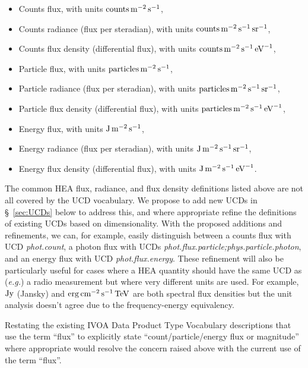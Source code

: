 \documentclass[11pt,a4paper]{ivoa}
\begin{document}
\begin{itemize}
\item Counts flux, with units $\rm\hbox{counts}\,m^{-2}\,s^{-1}$,
\item Counts radiance (flux per steradian), with units $\rm\hbox{counts}\,m^{-2}\,s^{-1}\,\hbox{sr}^{-1}$,
\item Counts flux density (differential flux), with units $\rm\hbox{counts}\,m^{-2}\,s^{-1}\,\hbox{eV}^{-1}$,
\item Particle flux, with units $\rm\hbox{particles}\,m^{-2}\,s^{-1}$,
\item Particle radiance (flux per steradian), with units $\rm\hbox{particles}\,m^{-2}\,s^{-1}\,\hbox{sr}^{-1}$,
\item Particle flux density (differential flux), with units $\rm\hbox{particles}\,m^{-2}\,s^{-1}\,\hbox{eV}^{-1}$,
\item Energy flux, with units $\rm J\,m^{-2}\,s^{-1}$,
\item Energy radiance (flux per steradian), with units $\rm J\,m^{-2}\,s^{-1}\,\hbox{sr}^{-1}$,
\item Energy flux density (differential flux), with units $\rm J\,m^{-2}\,s^{-1}\,\hbox{eV}^{-1}$.
\end{itemize}

The common \gls{HEA} flux, radiance, and flux density definitions listed above are not all covered by the UCD vocabulary.   We propose to add new UCDs in \S~\ref{sec:UCDs} below to address this, and where appropriate refine the definitions of existing UCDs based on dimensionality.  With the proposed additions and refinements, we can, for example, easily distinguish between a counts flux with UCD {\em phot.count\/}, a photon flux with UCDs {\em phot.flux.particle;phys.particle.photon\/}, and an energy flux with UCD {\em phot.\-flux.energy\/}.  These refinement will also be particularly useful for cases where a \gls{HEA} quantity should have the same UCD as ({\em e.g.\/}\null) a radio measurement but where very different units are used. For example, $\rm Jy$ (Jansky) and $\rm erg\,cm^{-2}\,s^{-1}\,TeV$ are both spectral flux densities but the unit analysis doesn’t agree due to the frequency-energy equivalency.

Restating the existing IVOA Data Product Type Vocabulary descriptions that use the term ``flux'' to explicitly state ``count/particle/energy flux or magnitude'' where appropriate would resolve the concern raised above with the current use of the term ``flux''.
\end{document}
